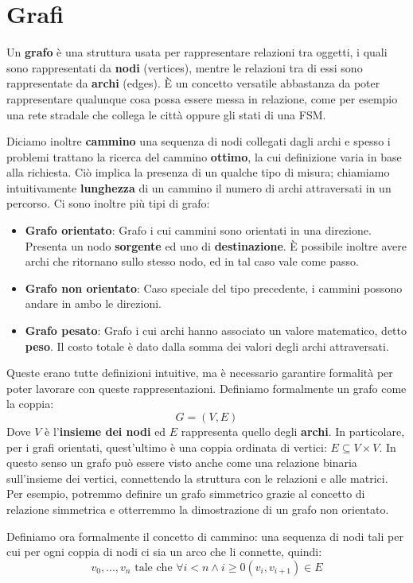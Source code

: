 \section{Grafi}
Un \textbf{grafo} è una struttura usata per rappresentare relazioni tra oggetti, i quali sono rappresentati da \textbf{nodi} (vertices), mentre le relazioni tra di essi sono rappresentate da \textbf{archi} (edges). È un concetto versatile abbastanza da poter rappresentare qualunque cosa possa essere messa in relazione, come per esempio una rete stradale che collega le città oppure gli stati di una FSM.\par
Diciamo inoltre \textbf{cammino} una sequenza di nodi collegati dagli archi e spesso i problemi trattano la ricerca del cammino \textbf{ottimo}, la cui definizione varia in base alla richiesta. Ciò implica la presenza di un qualche tipo di misura; chiamiamo intuitivamente \textbf{lunghezza} di un cammino il numero di archi attraversati in un percorso. Ci sono inoltre più tipi di grafo: \begin{itemize}
	\item \textbf{Grafo orientato}: Grafo i cui cammini sono orientati in una direzione. Presenta un nodo \textbf{sorgente} ed uno di \textbf{destinazione}. È possibile inoltre avere archi che ritornano sullo stesso nodo, ed in tal caso vale come passo.
	\item \textbf{Grafo non orientato}: Caso speciale del tipo precedente, i cammini possono andare in ambo le direzioni.
	\item \textbf{Grafo pesato}: Grafo i cui archi hanno associato un valore matematico, detto \textbf{peso}. Il costo totale è dato dalla somma dei valori degli archi attraversati.
\end{itemize}
\noindent Queste erano tutte definizioni intuitive, ma è necessario garantire formalità per poter lavorare con queste rappresentazioni. Definiamo formalmente un grafo come la coppia: \[G = (V,E)\]
\noindent Dove $V$ è l'\textbf{insieme dei nodi} ed $E$ rappresenta quello degli \textbf{archi}. In particolare, per i grafi orientati, quest'ultimo è una coppia ordinata di vertici: $E \subseteq V\times V$. In questo senso un grafo può essere visto anche come una relazione binaria sull’insieme dei vertici, connettendo la struttura con le relazioni e alle matrici. Per esempio, potremmo definire un grafo simmetrico grazie al concetto di relazione simmetrica e otterremmo la dimostrazione di un grafo non orientato.\par
Definiamo ora formalmente il concetto di cammino: una sequenza di nodi tali per cui per ogni coppia di nodi ci sia un arco che li connette, quindi: \[v_0, ..., v_n \text{ tale che } \forall i < n \land i\geq 0 (v_i, v_{i+1})\in E\]
